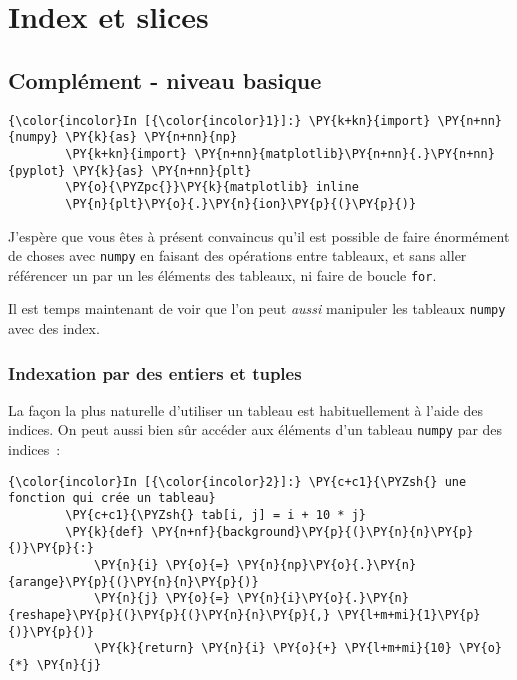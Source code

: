     
    
    
    

    

    \hypertarget{index-et-slices}{%
\section{Index et slices}\label{index-et-slices}}

    \hypertarget{compluxe9ment---niveau-basique}{%
\subsection{Complément - niveau
basique}\label{compluxe9ment---niveau-basique}}

    \begin{Verbatim}[commandchars=\\\{\}]
{\color{incolor}In [{\color{incolor}1}]:} \PY{k+kn}{import} \PY{n+nn}{numpy} \PY{k}{as} \PY{n+nn}{np}
        \PY{k+kn}{import} \PY{n+nn}{matplotlib}\PY{n+nn}{.}\PY{n+nn}{pyplot} \PY{k}{as} \PY{n+nn}{plt}
        \PY{o}{\PYZpc{}}\PY{k}{matplotlib} inline
        \PY{n}{plt}\PY{o}{.}\PY{n}{ion}\PY{p}{(}\PY{p}{)}
\end{Verbatim}


    J'espère que vous êtes à présent convaincus qu'il est possible de faire
énormément de choses avec \texttt{numpy} en faisant des opérations entre
tableaux, et sans aller référencer un par un les éléments des tableaux,
ni faire de boucle \texttt{for}.

Il est temps maintenant de voir que l'on peut \emph{aussi} manipuler les
tableaux \texttt{numpy} avec des index.

    \hypertarget{indexation-par-des-entiers-et-tuples}{%
\subsubsection{Indexation par des entiers et
tuples}\label{indexation-par-des-entiers-et-tuples}}

    La façon la plus naturelle d'utiliser un tableau est habituellement à
l'aide des indices. On peut aussi bien sûr accéder aux éléments d'un
tableau \texttt{numpy} par des indices~:

    \begin{Verbatim}[commandchars=\\\{\}]
{\color{incolor}In [{\color{incolor}2}]:} \PY{c+c1}{\PYZsh{} une fonction qui crée un tableau}
        \PY{c+c1}{\PYZsh{} tab[i, j] = i + 10 * j}
        \PY{k}{def} \PY{n+nf}{background}\PY{p}{(}\PY{n}{n}\PY{p}{)}\PY{p}{:}
            \PY{n}{i} \PY{o}{=} \PY{n}{np}\PY{o}{.}\PY{n}{arange}\PY{p}{(}\PY{n}{n}\PY{p}{)}
            \PY{n}{j} \PY{o}{=} \PY{n}{i}\PY{o}{.}\PY{n}{reshape}\PY{p}{(}\PY{p}{(}\PY{n}{n}\PY{p}{,} \PY{l+m+mi}{1}\PY{p}{)}\PY{p}{)}
            \PY{k}{return} \PY{n}{i} \PY{o}{+} \PY{l+m+mi}{10} \PY{o}{*} \PY{n}{j}
\end{Verbatim}


